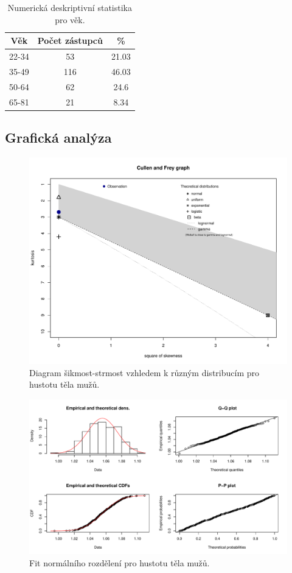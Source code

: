 \documentclass[11pt,american,czech]{article}
\begin{document}
\begin{table}[ht!]
	\centering
	\begin{tabular}{|c||c|c|}
		\hline 
		Věk &  Počet zástupců &  \%   \\ 
		\hline \hline 
		22-34 & 53 & 21.03   \\
		\hline
		35-49 & 116 & 46.03  \\
		\hline  
		50-64 & 62 &  24.6  \\
		\hline 
		65-81 & 21 &  8.34  \\
		\hline 
	
	\end{tabular} 
	\caption{Numerická deskriptivní statistika pro věk.}
	\label{tab:desc2}	
\end{table}
 
\subsection{Grafická analýza}

\newpage

\begin{figure}[ht!]
	\centering
	\includegraphics[width=0.85\linewidth]{Images/FIGURES/descdist_density}
	\caption{Diagram šikmost-strmost vzhledem k různým distribucím pro hustotu těla mužů.}
	\label{fig:descdist_density}
\end{figure}

\begin{figure}[ht!]
	\centering
	\includegraphics[width=1.0\linewidth]{Images/FIGURES/density_fitdist}
	\caption{Fit normálního rozdělení pro hustotu těla mužů.}
	\label{fig:density_fitdist}
\end{figure}

\newpage

%
%
%
%
\end{document}
